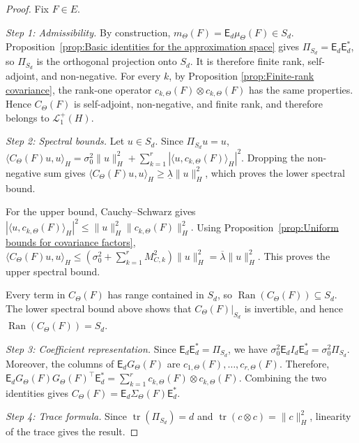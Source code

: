 \begin{proof}
Fix \(F\in E\).

\textit{Step 1: Admissibility.}
By construction, \(m_\Theta(F)=\mathsf E_d\mu_\Theta(F)\in S_d\). Proposition~\ref{prop:Basic identities for the approximation space} gives \(\Pi_{S_d}=\mathsf E_d\mathsf E_d^*\), so \(\Pi_{S_d}\) is the orthogonal projection onto \(S_d\). It is therefore finite rank, self-adjoint, and non-negative. For every \(k\), by Proposition \ref{prop:Finite-rank covariance}, the rank-one operator \(c_{k,\Theta}(F)\otimes c_{k,\Theta}(F)\) has the same properties. Hence \(C_\Theta(F)\) is self-adjoint, non-negative, and finite rank, and therefore belongs to \(\mathcal L_1^+(H)\).

\textit{Step 2: Spectral bounds.}
Let \(u\in S_d\). Since \(\Pi_{S_d}u=u\),
\(
\langle C_\Theta(F)u,u\rangle_H
=
\sigma_0^2\|u\|_H^2
+
\sum_{k=1}^r
|\langle u,c_{k,\Theta}(F)\rangle_H|^2.
\)
Dropping the non-negative sum gives \(\langle C_\Theta(F)u,u\rangle_H\geqslant\underline\lambda\|u\|_H^2\), which proves the lower spectral bound.

For the upper bound, Cauchy--Schwarz gives
\(
|\langle u,c_{k,\Theta}(F)\rangle_H|^2
\leqslant
\|u\|_H^2
\|c_{k,\Theta}(F)\|_H^2.
\)
Using Proposition~\ref{prop:Uniform bounds for covariance factors},
\(
\langle C_\Theta(F)u,u\rangle_H
\leqslant
\left(
\sigma_0^2
+
\sum_{k=1}^rM_{C,k}^2
\right)
\|u\|_H^2
=
\overline\lambda\|u\|_H^2.
\)
This proves the upper spectral bound.

Every term in \(C_\Theta(F)\) has range contained in \(S_d\), so \(\operatorname{Ran}(C_\Theta(F))\subseteq S_d\). The lower spectral bound above shows that \(C_\Theta(F)|_{S_d}\) is invertible, and hence \(\operatorname{Ran}(C_\Theta(F))=S_d\).

\textit{Step 3: Coefficient representation.}
Since \(\mathsf E_d\mathsf E_d^*=\Pi_{S_d}\), we have \(\sigma_0^2\mathsf E_dI_d\mathsf E_d^*=\sigma_0^2\Pi_{S_d}\). Moreover, the columns of \(\mathsf E_dG_\Theta(F)\) are \(c_{1,\Theta}(F),\ldots,c_{r,\Theta}(F)\). Therefore,
\(
\mathsf E_d
G_\Theta(F)G_\Theta(F)^\top
\mathsf E_d^*
=
\sum_{k=1}^r
c_{k,\Theta}(F)
\otimes
c_{k,\Theta}(F).
\)
Combining the two identities gives \(C_\Theta(F)=\mathsf E_d\Sigma_\Theta(F)\mathsf E_d^*\).

\textit{Step 4: Trace formula.}
Since \(\operatorname{tr}(\Pi_{S_d})=d\) and \(\operatorname{tr}(c\otimes c)=\|c\|_H^2\), linearity of the trace gives the result.
\end{proof}

